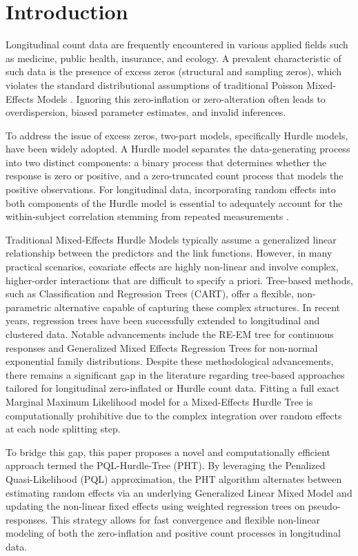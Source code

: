 \documentclass[twoside]{article}
\begin{document}
\section{Introduction}

Longitudinal count data are frequently encountered in various applied fields such as medicine, public health, insurance, and ecology. A prevalent characteristic of such data is the presence of excess zeros (structural and sampling zeros), which violates the standard distributional assumptions of traditional Poisson Mixed-Effects Models \citep{MSN2008}. Ignoring this zero-inflation or zero-alteration often leads to overdispersion, biased parameter estimates, and invalid inferences. 

To address the issue of excess zeros, two-part models, specifically Hurdle models, have been widely adopted. A Hurdle model separates the data-generating process into two distinct components: a binary process that determines whether the response is zero or positive, and a zero-truncated count process that models the positive observations. For longitudinal data, incorporating random effects into both components of the Hurdle model is essential to adequately account for the within-subject correlation stemming from repeated measurements \citep{MinAgresti2005}. 

Traditional Mixed-Effects Hurdle Models typically assume a generalized linear relationship between the predictors and the link functions. However, in many practical scenarios, covariate effects are highly non-linear and involve complex, higher-order interactions that are difficult to specify a priori. Tree-based methods, such as Classification and Regression Trees (CART), offer a flexible, non-parametric alternative capable of capturing these complex structures. In recent years, regression trees have been successfully extended to longitudinal and clustered data. Notable advancements include the RE-EM tree \citep{sela2012re} for continuous responses and Generalized Mixed Effects Regression Trees \citep{HLB17} for non-normal exponential family distributions. Despite these methodological advancements, there remains a significant gap in the literature regarding tree-based approaches tailored for longitudinal zero-inflated or Hurdle count data. Fitting a full exact Marginal Maximum Likelihood  model for a Mixed-Effects Hurdle Tree is computationally prohibitive due to the complex integration over random effects at each node splitting step. 

To bridge this gap, this paper proposes a novel and computationally efficient approach termed the PQL-Hurdle-Tree (PHT). By leveraging the Penalized Quasi-Likelihood (PQL) approximation, the PHT algorithm alternates between estimating random effects via an underlying Generalized Linear Mixed Model and updating the non-linear fixed effects using weighted regression trees on pseudo-responses. This strategy allows for fast convergence and flexible non-linear modeling of both the zero-inflation and positive count processes in longitudinal data.
\end{document}
